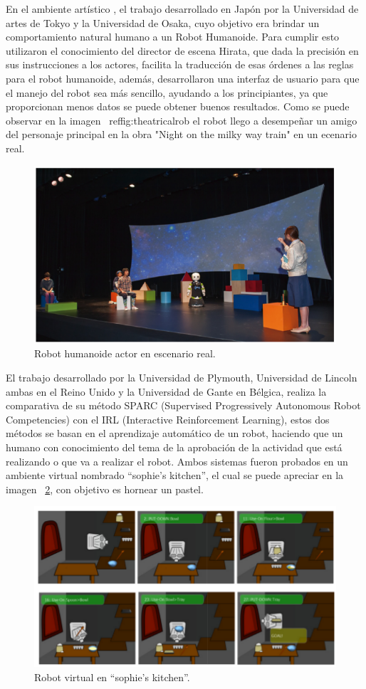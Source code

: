 En el ambiente artístico \cite{Nishiguchi2017}, el trabajo desarrollado en
 Japón por la Universidad de artes de Tokyo y la Universidad de Osaka, cuyo
 objetivo era brindar un comportamiento natural humano a un Robot Humanoide.
 Para cumplir esto utilizaron el conocimiento del director de escena Hirata,
 que dada la precisión en sus instrucciones a los actores, facilita la
 traducción de esas órdenes a las reglas para el robot humanoide, además,
 desarrollaron una interfaz de usuario para que el manejo del robot sea más
 sencillo, ayudando a los principiantes, ya que proporcionan menos datos se
 puede obtener buenos resultados. Como se puede observar en la imagen
 ~ref{fig:theatricalrob} el robot llego a desempeñar un amigo del
 personaje principal en la obra "Night on the milky way train" en un ecenario
 real.


\begin{figure}[H]
\centering
\includegraphics[width=0.8\columnwidth]{CapituloI/Imagenes/Theatrical.png}
\caption{Robot humanoide actor en escenario real.}
\label{fig:theatricalrob}
\end{figure} 


El trabajo desarrollado por la Universidad de Plymouth, Universidad de Lincoln
 ambas en el Reino Unido y la Universidad de Gante en Bélgica\cite{Senft2016},
 realiza la comparativa de su método SPARC (Supervised Progressively Autonomous
 Robot Competencies) con el IRL (Interactive Reinforcement Learning), estos dos
 métodos se basan en el aprendizaje automático de un robot, haciendo que un
 humano con conocimiento del tema de la aprobación de la actividad que está
 realizando o que va a realizar el robot. Ambos sistemas fueron probados en un
 ambiente virtual nombrado “sophie’s kitchen”, el cual se puede apreciar en la
 imagen ~\ref{fig:sparcrob}, con objetivo es hornear un pastel.
 
 
\begin{figure}[H]
\centering
\includegraphics[width=0.8\columnwidth]{CapituloI/Imagenes/Sparc.png}
\caption{Robot virtual en “sophie’s kitchen”.}
\label{fig:sparcrob}
\end{figure}


